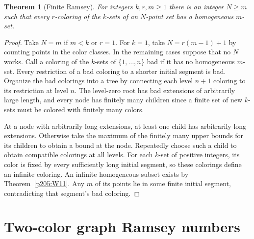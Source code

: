 \documentclass[11pt,oneside,openany]{book}
\theoremstyle{plain}
\newtheorem{theorem}{Theorem}[chapter]
\theoremstyle{definition}
\theoremstyle{remark}
\begin{document}
\begin{theorem}[Finite Ramsey]\label{p205:W12}
For integers \(k,r,m\ge1\) there is an integer \(N\ge m\) such that
every \(r\)-coloring of the \(k\)-sets of an \(N\)-point set has a
homogeneous \(m\)-set.
\end{theorem}
\begin{proof}
Take \(N=m\) if \(m<k\) or \(r=1\). For \(k=1\), take
\(N=r(m-1)+1\) by counting points in the color classes.
In the remaining cases suppose that no \(N\) works. Call a coloring
of the \(k\)-sets of \(\{1,\ldots,n\}\) bad if it has no homogeneous
\(m\)-set. Every restriction of a bad coloring to a shorter
initial segment is bad. Organize the bad colorings into a tree by
connecting each level \(n+1\) coloring to its restriction at level
\(n\). The level-zero root has bad extensions of arbitrarily large
length, and every node has finitely many children since a finite
set of new \(k\)-sets must be colored with finitely many colors.

At a node with arbitrarily long extensions, at least one child
has arbitrarily long extensions. Otherwise take the maximum of
the finitely many upper bounds for its children to obtain a bound
at the node. Repeatedly choose such a child to obtain compatible
colorings at all levels. For each \(k\)-set of positive integers,
its color is fixed by every sufficiently long initial segment,
so these colorings define an infinite coloring. An infinite
homogeneous subset exists by Theorem~\ref{p205:W11}. Any \(m\)
of its points lie in some finite initial segment, contradicting
that segment's bad coloring.
\end{proof}

\section{Two-color graph Ramsey numbers}
\end{document}
